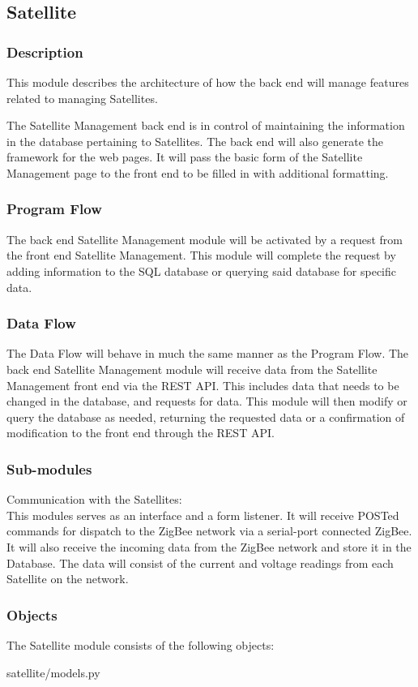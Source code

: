 
\subsection{Satellite}

\subsubsection{Description}

This module describes the architecture of how the back end will manage features related to managing Satellites. 

The Satellite Management back end is in control of maintaining the information in the database pertaining to Satellites. 
The back end will also generate the framework for the web pages. 
It will pass the basic form of the Satellite Management page to the front end to be filled in with additional formatting. 

\subsubsection{Program Flow}

The back end Satellite Management module will be activated by a request from the front end Satellite Management. 
This module will complete the request by adding information to the \ac{SQL} database or querying said database for specific data. 

\subsubsection{Data Flow}

The Data Flow will behave in much the same manner as the Program Flow. 
The back end Satellite Management module will receive data from the Satellite Management front end via the \ac{REST} \ac{API}. 
This includes data that needs to be changed in the database, and requests for data. 
This module will then modify or query the database as needed, 
returning the requested data or a confirmation of modification to the front end through the \ac{REST} \ac{API}. 

\subsubsection{Sub-modules}
Communication with the Satellites:\\
This modules serves as an interface and a form listener. 
It will receive \ac{POST}ed commands for dispatch to the ZigBee network via a serial-port connected ZigBee. 
It will also receive the incoming data from the ZigBee network and store it in the Database. 
The data will consist of the current and voltage readings from each Satellite on the network. 

\subsubsection{Objects}

The Satellite module consists of the following objects:

\begin{table}[H]
  \centering
  \caption{satellite/models.py}
  \label{code:satellite/models}
  
\end{table}